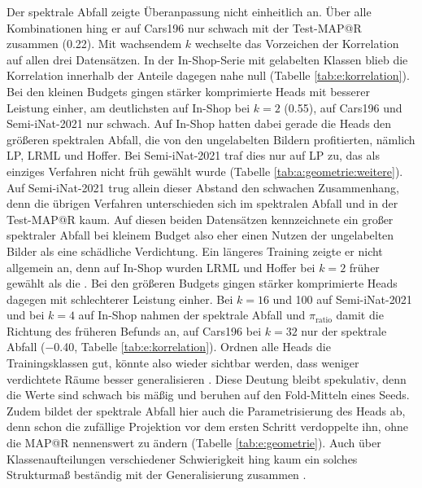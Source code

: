 Der spektrale Abfall zeigte Überanpassung nicht einheitlich an. Über alle Kombinationen hing er auf Cars196 nur schwach mit der Test-\ac{MAP@R} zusammen (\num{0.22}). Mit wachsendem $k$ wechselte das Vorzeichen der Korrelation auf allen drei Datensätzen. In der In-Shop-Serie mit gelabelten Klassen blieb die Korrelation innerhalb der Anteile dagegen nahe null (Tabelle \ref{tab:e:korrelation}). Bei den kleinen Budgets gingen stärker komprimierte Heads mit besserer Leistung einher, am deutlichsten auf In-Shop bei $k=2$ (\num{0.55}), auf Cars196 und Semi-iNat-2021 nur schwach. Auf In-Shop hatten dabei gerade die Heads den größeren spektralen Abfall, die von den ungelabelten Bildern profitierten, nämlich \ac{LP}, \ac{LRML} und Hoffer. Bei Semi-iNat-2021 traf dies nur auf \ac{LP} zu, das als einziges Verfahren nicht früh gewählt wurde (Tabelle \ref{tab:a:geometrie:weitere}). Auf Semi-iNat-2021 trug allein dieser Abstand den schwachen Zusammenhang, denn die übrigen Verfahren unterschieden sich im spektralen Abfall und in der Test-\ac{MAP@R} kaum. Auf diesen beiden Datensätzen kennzeichnete ein großer spektraler Abfall bei kleinem Budget also eher einen Nutzen der ungelabelten Bilder als eine schädliche Verdichtung. Ein längeres Training zeigte er nicht allgemein an, denn auf In-Shop wurden \ac{LRML} und Hoffer bei $k=2$ früher gewählt als die \UEBL. Bei den größeren Budgets gingen stärker komprimierte Heads dagegen mit schlechterer Leistung einher. Bei $k=16$ und 100 auf Semi-iNat-2021 und bei $k=4$ auf In-Shop nahmen der spektrale Abfall und $\pi_{\mathrm{ratio}}$ damit die Richtung des früheren Befunds an, auf Cars196 bei $k=32$ nur der spektrale Abfall (\num{-0.40}, Tabelle \ref{tab:e:korrelation}). Ordnen alle Heads die Trainingsklassen gut, könnte also wieder sichtbar werden, dass weniger verdichtete Räume besser generalisieren \cite{roth_revisiting_2020}. Diese Deutung bleibt spekulativ, denn die Werte sind schwach bis mäßig und beruhen auf den Fold-Mitteln eines Seeds. Zudem bildet der spektrale Abfall hier auch die Parametrisierung des Heads ab, denn schon die zufällige Projektion vor dem ersten Schritt verdoppelte ihn, ohne die \ac{MAP@R} nennenswert zu ändern (Tabelle \ref{tab:e:geometrie}). Auch über Klassenaufteilungen verschiedener Schwierigkeit hing kaum ein solches Strukturmaß beständig mit der Generalisierung zusammen \cite{milbich_characterizing_2021}.

